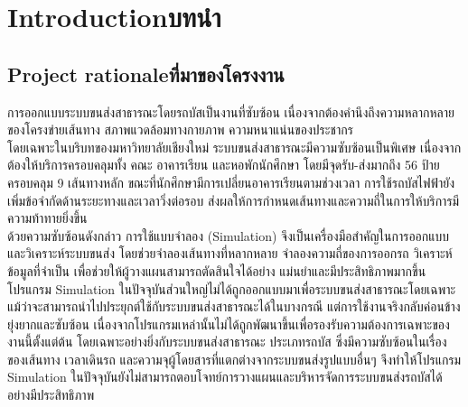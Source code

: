 \chapter{\ifenglish Introduction\else บทนำ\fi}

\newenvironment{mypara}{\par\indent}{}

\setlength{\parindent}{2em}

\section{\ifenglish Project rationale\else ที่มาของโครงงาน\fi}
\begin{mypara}
    \indent การออกแบบระบบขนส่งสาธารณะโดยรถบัสเป็นงานที่ซับซ้อน เนื่องจากต้องคำนึงถึงความหลากหลายของโครงข่ายเส้นทาง 
    สภาพแวดล้อมทางกายภาพ ความหนาแน่นของประชากร \\ 
    \indent โดยเฉพาะในบริบทของมหาวิทยาลัยเชียงใหม่ ระบบขนส่งสาธารณะมีความซับซ้อนเป็นพิเศษ 
    เนื่องจากต้องให้บริการครอบคลุมทั้ง คณะ อาคารเรียน และหอพักนักศึกษา โดยมีจุดรับ-ส่งมากถึง 56 ป้าย ครอบคลุม 9 เส้นทางหลัก 
    ขณะที่นักศึกษามีการเปลี่ยนอาคารเรียนตามช่วงเวลา การใช้รถบัสไฟฟ้ายังเพิ่มข้อจำกัดด้านระยะทางและเวลาวิ่งต่อรอบ 
    ส่งผลให้การกำหนดเส้นทางและความถี่ในการให้บริการมีความท้าทายยิ่งขึ้น \\
    \indent ด้วยความซับซ้อนดังกล่าว การใช้แบบจำลอง (Simulation) จึงเป็นเครื่องมือสำคัญในการออกแบบและวิเคราะห์ระบบขนส่ง 
    โดยช่วยจำลองเส้นทางที่หลากหลาย จำลองความถี่ของการออกรถ วิเคราะห์ข้อมูลที่จำเป็น เพื่อช่วยให้ผู้วางแผนสามารถตัดสินใจได้อย่าง
    แม่นยำและมีประสิทธิภาพมากขึ้น  \\
    \indent โปรแกรม Simulation ในปัจจุบันส่วนใหญ่ไม่ได้ถูกออกแบบมาเพื่อระบบขนส่งสาธารณะโดยเฉพาะ \\
    แม้ว่าจะสามารถนำไปประยุกต์ใช้กับระบบขนส่งสาธารณะได้ในบางกรณี แต่การใช้งานจริงกลับค่อนข้างยุ่งยากและซับซ้อน 
    เนื่องจากโปรแกรมเหล่านั้นไม่ได้ถูกพัฒนาขึ้นเพื่อรองรับความต้องการเฉพาะของงานนี้ตั้งแต่ต้น โดยเฉพาะอย่างยิ่งกับระบบขนส่งสาธารณะ
    ประเภทรถบัส ซึ่งมีความซับซ้อนในเรื่องของเส้นทาง เวลาเดินรถ และความจุผู้โดยสารที่แตกต่างจากระบบขนส่งรูปแบบอื่นๆ 
    จึงทำให้โปรแกรม Simulation ในปัจจุบันยังไม่สามารถตอบโจทย์การวางแผนและบริหารจัดการระบบขนส่งรถบัสได้อย่างมีประสิทธิภาพ
\end{mypara}

